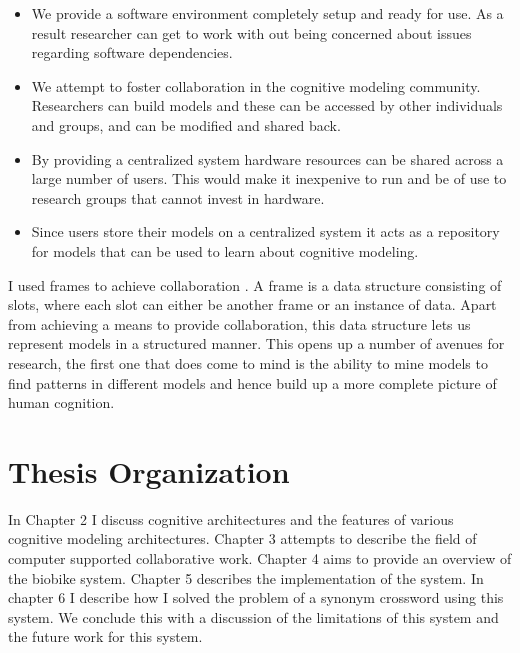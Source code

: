 \begin{itemize}
\item We provide a software environment completely setup and ready for
  use. As a result researcher can get to work with out being concerned
  about issues regarding software dependencies.
\item We attempt to foster collaboration in the cognitive modeling
  community. Researchers can build models and these can be accessed by
  other individuals and groups, and can be modified and shared back.
\item By providing a centralized system hardware resources can be
  shared across a large number of users. This would make it inexpenive
  to run and be of use to research groups that cannot invest in
  hardware.
\item Since users store their models on a centralized
  system it acts as a repository for models that can be used to
  learn about cognitive modeling.
\end{itemize}


I used frames \cite{Minsky1974a} to achieve collaboration
. A frame is a data structure consisting of slots, where each
slot can either be another frame or an instance of data. Apart from
achieving a means to provide collaboration, this data structure lets
us represent models in a structured manner. This opens up a number of
avenues for research, the first one that does come to mind is the
ability to mine models to find patterns in different models and
hence build up a more complete picture of human cognition.



\section{Thesis Organization}
In Chapter 2 I discuss cognitive architectures and the features of
various cognitive modeling 
architectures. Chapter 3 attempts to describe the field of computer supported
collaborative work. Chapter 4 aims to provide an overview of the
biobike system. Chapter 5 describes the implementation of the
system. In chapter 6 I describe how I solved the problem of a synonym
crossword using this system. We conclude this with a discussion of the
limitations of this system and the future work for this system.